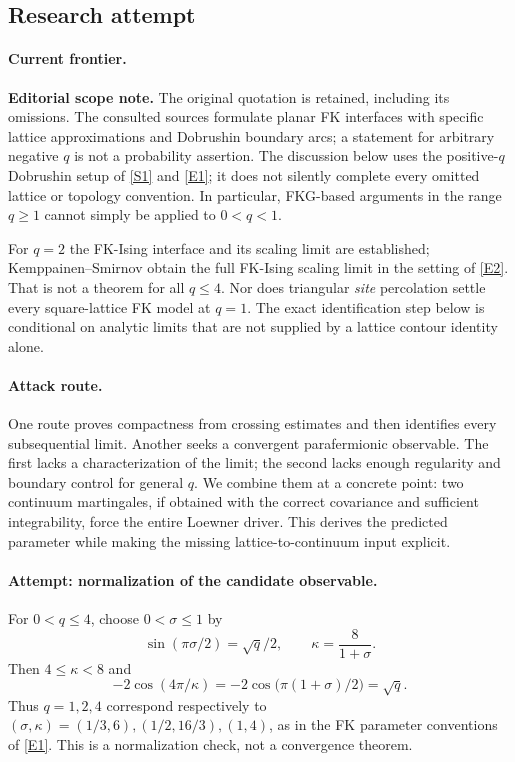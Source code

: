 \documentclass[11pt,a4paper]{article}
\newcommand{\sref}[2]{\hyperlink{source:#1:#2}{[S#2]}}
\newcommand{\eref}[2]{\hyperlink{extra:#1:#2}{[E#2]}}
\numberwithin{equation}{section}
\begin{document}
\subsection{Research attempt}

\paragraph{Current frontier.}
\textbf{Editorial scope note.} The original quotation is retained, including
its omissions. The consulted sources formulate planar FK interfaces with
specific lattice approximations and Dobrushin boundary arcs; a statement
for arbitrary negative $q$ is not a probability assertion. The discussion
below uses the positive-$q$ Dobrushin setup of \sref{173}{1} and
\eref{173}{1}; it does not silently complete every omitted lattice or
topology convention. In particular, FKG-based arguments in the range
$q\ge1$ cannot simply be applied to $0<q<1$.

For $q=2$ the FK-Ising interface and its scaling limit are established;
Kemppainen--Smirnov obtain the full FK-Ising scaling limit in the setting of
\eref{173}{2}. That is not a theorem for all $q\le4$. Nor does triangular
\emph{site} percolation settle every square-lattice FK model at $q=1$.
The exact identification step below is conditional on analytic limits that
are not supplied by a lattice contour identity alone.

\paragraph{Attack route.}
One route proves compactness from crossing estimates and then identifies
every subsequential limit. Another seeks a convergent parafermionic
observable. The first lacks a characterization of the limit; the second
lacks enough regularity and boundary control for general $q$. We combine
them at a concrete point: two continuum martingales, if obtained with the
correct covariance and sufficient integrability, force the entire Loewner
driver. This derives the predicted parameter while making the missing
lattice-to-continuum input explicit.

\paragraph{Attempt: normalization of the candidate observable.}
For $0<q\le4$, choose $0<\sigma\le1$ by
\[
 \sin(\pi\sigma/2)=\sqrt q/2,
 \qquad \kappa=\frac8{1+\sigma}.
\]
Then $4\le\kappa<8$ and
\[
 -2\cos(4\pi/\kappa)
   =-2\cos\bigl(\pi(1+\sigma)/2\bigr)=\sqrt q.
\]
Thus $q=1,2,4$ correspond respectively to
$(\sigma,\kappa)=(1/3,6),(1/2,16/3),(1,4)$, as in the FK parameter
conventions of \eref{173}{1}. This is a normalization check, not a
convergence theorem.
\end{document}
